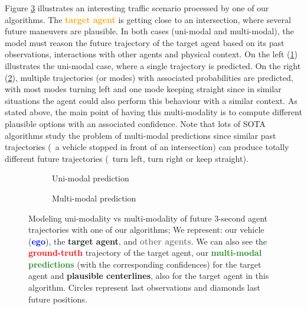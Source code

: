 Figure \ref{fig:chapter_2_related_works/um_vs_mm_mp} illustrates an interesting traffic scenario processed by one of our algorithms. The \textbf{\textcolor{orange}{target agent}} is getting close to an intersection, where several future maneuvers are plausible. In both cases (uni-modal and multi-modal), the model must reason the future trajectory of the target agent based on its past observations, interactions with other agents and physical context. On the left (\ref{subfig:chapter_2_related_works/um_vs_mm_mp_a}) illustrates the uni-modal case, where a single trajectory is predicted. On the right (\ref{subfig:chapter_2_related_works/um_vs_mm_mp_b}), multiple trajectories (or modes) with associated probabilities are predicted, with most modes turning left and one mode keeping straight since in similar situations the agent could also perform this behaviour with a similar context. As stated above, the main point of having this multi-modality is to compute different plausible options with an associated confidence. Note that lots of \ac{SOTA} algorithms study the problem of multi-modal predictions since similar past trajectories (\eg \ a vehicle stopped in front of an intersection) can produce totally different future trajectories (\eg \ turn left, turn right or keep straight).

\begin{figure}[t!]
	\begin{subfigure}{0.48\textwidth}
		\caption{Uni-modal prediction}
		\label{subfig:chapter_2_related_works/um_vs_mm_mp_a}
	\end{subfigure}
	\hfill
	\begin{subfigure}{0.48\textwidth}
		\caption{Multi-modal prediction}
		\label{subfig:chapter_2_related_works/um_vs_mm_mp_b}
	\end{subfigure}
	\captionsetup{justification=justified}
	\caption[Modeling uni-modality vs multi-modality of future $3$-second agent trajectories with one of our algorithms]{Modeling uni-modality vs multi-modality of future $3$-second agent trajectories with one of our algorithms; We represent: our vehicle (\textbf{\textcolor{blue}{ego}}), the \textbf{\textcolor{YellowOrange}{target agent}}, and \textbf{\textcolor{gray}{other agents}}. We can also see the \textbf{\textcolor{red}{ground-truth}} trajectory of the target agent, our \textbf{\textcolor{ForestGreen}{multi-modal predictions}} (with the corresponding confidences) for the target agent and \textbf{plausible centerlines}, also for the target agent in this algorithm. Circles represent last observations and diamonds last future positions.}
	\label{fig:chapter_2_related_works/um_vs_mm_mp}
\end{figure}

